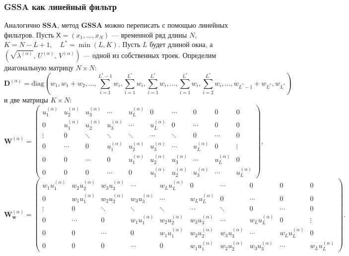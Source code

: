 \documentclass[a4paper, 11pt]{article}
\newcommand{\SSA}{\textbf{SSA}}
\newcommand{\GSSA}{\textbf{GSSA}}
\newcommand{\TS}{\mathsf{X}}
\begin{document}
\subsubsection{GSSA как линейный фильтр}
Аналогично $\SSA$, метод $\GSSA$ можно переписать с помощью линейных фильтров.
Пусть $\TS = (x_1, \dots, x_{N})$ --- временной ряд длины $N$, $K = N - L + 1, \quad L^{*} = \min(L, K)$. Пусть $L$ будет длиной окна, а $(\sqrt{\lambda^{(\alpha)}},\,U^{(\alpha)},\,V^{(\alpha)})$ — одной из собственных троек. Определим диагональную матрицу $N \times N$:
$$
\mathbf{D}^{(\alpha)} = \text{diag}(w_1, w_1 + w_2, \ldots,
\sum \limits_{i = 1}^{L^*-1}w_i,
\sum \limits_{i = 1}^{L^*}w_i, \sum \limits_{i = 1}^{L^*}w_i, \ldots, \sum \limits_{i = 1}^{L^*}w_i,
\sum \limits_{i = 2}^{L^*}w_i, \ldots, w_{L^*-1}+ w_{L^*}, w_{L^*})
$$
и две матрицы  $K \times N$:
\[
\mathbf{W}^{(\alpha)} = \begin{pmatrix}
	u_{1}^{(\alpha)} & u_{2}^{(\alpha)} & u_{3}^{(\alpha)} & \cdots & u_{L}^{(\alpha)} & 0 & \cdots & 0 & 0 & 0 \\
	0 & u_{1}^{(\alpha)} & u_{2}^{(\alpha)} & u_{3}^{(\alpha)} & \cdots & u_{L}^{(\alpha)} & 0 & \cdots & 0 & 0 \\
	\vdots & 0 & \ddots & \ddots & \ddots & \cdots & \ddots & 0 & \cdots & 0 \\
	0 & \cdots & 0 & u_{1}^{(\alpha)} & u_{2}^{(\alpha)} & u_{3}^{(\alpha)} & \cdots & u_{L}^{(\alpha)} & 0 & \vdots \\
	0 & 0 & \cdots & 0 & u_{1}^{(\alpha)} & u_{2}^{(\alpha)} & u_{3}^{(\alpha)} & \cdots & u_{L}^{(\alpha)} & 0 \\
	0 & 0 & 0 & \cdots & 0 & u_{1}^{(\alpha)} & u_{2}^{(\alpha)} & u_{3}^{(\alpha)} & \cdots & u_{L}^{(\alpha)}
\end{pmatrix},
\]
\[
\mathbf{W}_{\boldsymbol{w}}^{(\alpha)} = \begin{pmatrix}
	w_1 u_{1}^{(\alpha)} & w_2 u_{2}^{(\alpha)} & w_3 u_{3}^{(\alpha)} & \cdots & w_L u_{L}^{(\alpha)} & 0 & \cdots & 0 & 0 & 0 \\
	0 & w_1 u_{1}^{(\alpha)} & w_2 u_{2}^{(\alpha)} & w_3 u_{3}^{(\alpha)} & \cdots & w_L u_{L}^{(\alpha)} & 0 & \cdots & 0 & 0 \\
	\vdots & 0 & \ddots & \ddots & \ddots & \cdots & \ddots & 0 & \cdots & 0 \\
	0 & \cdots & 0 & w_1 u_{1}^{(\alpha)} & w_2 u_{2}^{(\alpha)} & w_3 u_{3}^{(\alpha)} & \cdots & w_L u_{L}^{(\alpha)} & 0 & \vdots \\
	0 & 0 & \cdots & 0 & w_1 u_{1}^{(\alpha)} & w_2 u_{2}^{(\alpha)} & w_3 u_{3}^{(\alpha)} & \cdots & w_L u_{L}^{(\alpha)} & 0 \\
	0 & 0 & 0 & \cdots & 0 & w_1 u_{1}^{(\alpha)} & w_2 u_{2}^{(\alpha)} & w_3 u_{3}^{(\alpha)} & \cdots & w_L u_{L}^{(\alpha)}
\end{pmatrix}.
\]
\end{document}
